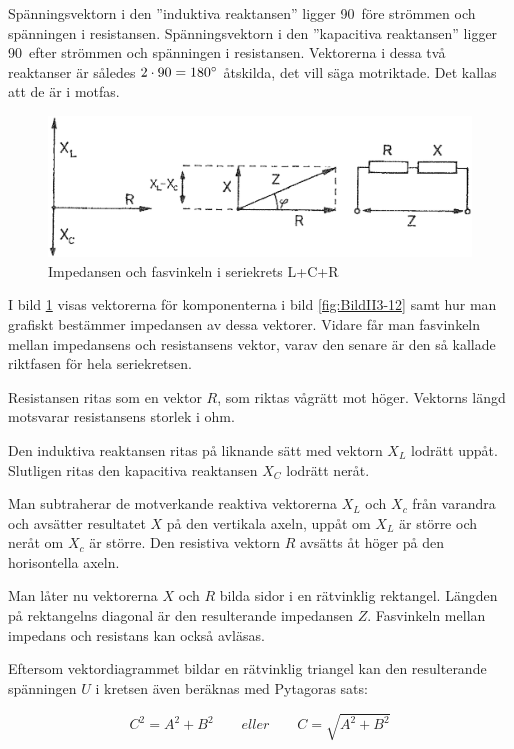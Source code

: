 Spänningsvektorn i den ''induktiva reaktansen'' ligger 90\degree~före strömmen
och spänningen i resistansen.
Spänningsvektorn i den ''kapacitiva reaktansen'' ligger 90\degree~efter
strömmen och spänningen i resistansen.
Vektorerna i dessa två reaktanser är således \(2 \cdot 90 = 180\degree\)
åtskilda, det vill säga motriktade.
Det kallas att de är i motfas.

\begin{figure}
\includegraphics[width=\textwidth]{images/cropped_pdfs/bild_2_3-14.pdf}
\caption{Impedansen och fasvinkeln i seriekrets L+C+R}
\label{fig:BildII3-14}
\end{figure}

I bild \ref{fig:BildII3-14} visas vektorerna för komponenterna i bild
\ref{fig:BildII3-12} samt hur man grafiskt bestämmer impedansen av dessa
vektorer.
Vidare får man fasvinkeln mellan impedansens och resistansens vektor, varav den
senare är den så kallade riktfasen för hela seriekretsen.

Resistansen ritas som en vektor \(R\), som riktas vågrätt mot höger.
Vektorns längd motsvarar resistansens storlek i ohm.

Den induktiva reaktansen ritas på liknande sätt med vektorn \(X_L\) lodrätt
uppåt.
Slutligen ritas den kapacitiva reaktansen \(X_C\) lodrätt neråt.

Man subtraherar de motverkande reaktiva vektorerna \(X_L\) och \(X_c\) från
varandra och avsätter resultatet \(X\) på den vertikala axeln, uppåt om \(X_L\)
är större och neråt om \(X_c\) är större.
Den resistiva vektorn \(R\) avsätts åt höger på den horisontella axeln.

Man låter nu vektorerna \(X\) och \(R\) bilda sidor i en rätvinklig rektangel.
Längden på rektangelns diagonal är den resulterande impedansen \(Z\).
Fasvinkeln mellan impedans och resistans kan också avläsas.

Eftersom vektordiagrammet bildar en rätvinklig triangel kan den resulterande
spänningen \(U\) i kretsen även beräknas med Pytagoras sats:

\[ C^2 = A^2 + B^2 \qquad eller \qquad C = \sqrt{A^2 + B^2} \]

